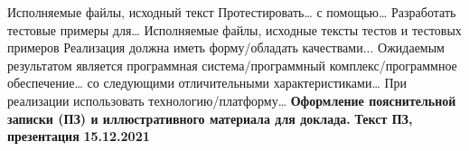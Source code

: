 {  {Исполняемые файлы, исходный текст}%
  {}{}%
  \projecttask{\projectsubtasknum}%
  {Протестировать… с помощью…}%
  {}%
  {}{}%
  \projecttask{\projectsubtasknum}%
  {Разработать тестовые примеры для… }%
  {Исполняемые файлы, исходные тексты тестов и тестовых примеров}%
  {}{}%
  \projecttask{\projectsubtasknum}%
  {Реализация должна иметь форму/обладать качествами...}%
  {}%
  {}{}%
  \projecttask{\projectsubtasknum}%
  {Ожидаемым результатом является программная система/программный
    комплекс/программное обеспечение… со следующими отличительными
    характеристиками…}%
  {}%
  {}{}%
  \projecttask{\projectsubtasknum}%
  {При реализации использовать технологию/платформу…}%
  {}%
  {}{}%
  \projecttask{\bfseries\projecttasknum}%
  {\bfseries Оформление пояснительной записки (ПЗ) и иллюстративного материала
    для доклада.}%
  {\bfseries Текст ПЗ, презентация}%
  {\bfseries 15.12.2021}{} }

\taskliterature{
\nocite{Sychev}
\nocite{Sokolov}
\nocite{Gaidaenko}
}



%
%

%
%
\consultantrspzapproval{}%

%

\authorpzapproval{}%
%
\consultantpzapproval{}%

%

